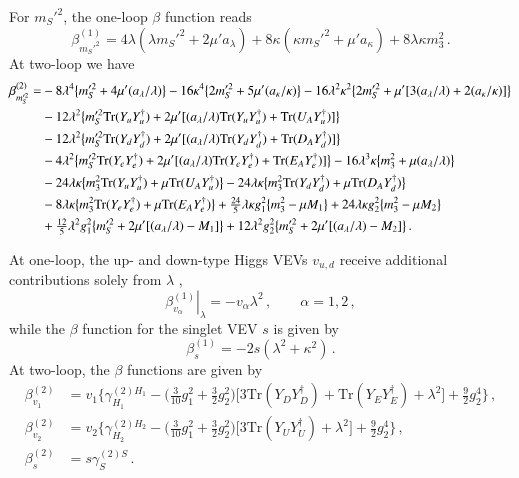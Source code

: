 \documentclass[final,3p,times]{elsarticle}
\newcommand{\be}{\begin{equation}}
\newcommand{\ee}{\end{equation}}
\newcommand{\lamsq}{\lambda^2}
\newcommand{\kapsq}{\kappa^2}
\newcommand{\tr}{\mathrm{Tr}}
\newcommand{\mtrisq}{m_3^2}
\newcommand{\msprsq}{m_S'^2}
\newcommand{\Alam}{a_\lambda/\lambda}
\begin{document}
For $\msprsq$, the one-loop $\beta$ function reads
%
\begin{equation}
\beta_{\msprsq}^{(1)} = 4\lambda(\lambda\msprsq + 2\mu' a_\lambda) + 8\kappa(\kappa\msprsq + \mu' a_\kappa) + 8\lambda\kappa\mtrisq \,.
\end{equation}
%
%
At two-loop we have
\begin{align}
\beta_{\msprsq}^{(2)} =& -8\lambda^4\big\{\msprsq + 4\mu'(a_\lambda/\lambda)\big\} - 16\kappa^4\big\{ 2\msprsq + 5\mu'(a_\kappa/\kappa) \big\} 
- 16\lamsq\kapsq\big\{ 2\msprsq + \mu'[3(a_\lambda/\lambda) + 2(a_\kappa/\kappa)] \big\} \notag \\
%
&-12\lamsq\big\{ \msprsq\tr( Y_u Y_u^\dagger) + 2\mu'[(\Alam)\tr( Y_u Y_u^\dagger) + \tr( U_A Y_u^\dagger)] \big\} \notag \\
%
&-12\lamsq\big\{\msprsq\tr( Y_d Y_d^\dagger) + 2\mu'[(\Alam)\tr( Y_d Y_d^\dagger) + \tr( D_A Y_d^\dagger)] \big\} \notag \\
%
&-4\lamsq\big\{\msprsq\tr( Y_e Y_e^\dagger) + 2\mu'[(\Alam)\tr( Y_e Y_e^\dagger) + \tr( E_A Y_e^\dagger)] \big\} 
-16\lambda^3\kappa\big\{ \mtrisq + \mu(\Alam)\big \} \notag \\
%
&-24\lambda\kappa\big\{ \mtrisq\tr( Y_u Y_u^\dagger) + \mu\tr( U_A Y_u^\dagger)\big\} 
-24\lambda\kappa\big\{ \mtrisq\tr( Y_d Y_d^\dagger) + \mu\tr( D_A Y_d^\dagger)\big\} \notag \\
%
&-8\lambda\kappa\big\{ \mtrisq\tr( Y_e Y_e^\dagger) + \mu\tr( E_A Y_e^\dagger)\big\} 
+\tfrac{24}{5}\lambda\kappa g_1^2\big\{\mtrisq - \mu M_1\big\} + 24\lambda\kappa g_2^2\big\{\mtrisq - \mu M_2 \big\} \notag \\
%
&+\tfrac{12}{5}\lamsq g_1^2\big\{\msprsq + 2\mu'[(\Alam) - M_1]\big\} 
+12\lamsq g_2^2 \big\{\msprsq + 2\mu'[(\Alam) - M_2] \big\}\,.
\end{align}

At one-loop, the up- and down-type Higgs VEVs $v_{u,d}$ receive additional contributions solely from $\lambda$ \cite{Sper13},
%
\be
\left.\beta^{(1)}_{v_\alpha}\right|_\lambda = -v_\alpha\lamsq\,, \qquad \alpha=1,2\,,
\ee
%
while the $\beta$ function for the singlet VEV $s$ is given by
%
\be 
\beta^{(1)}_s = -2s(\lamsq + \kapsq)\,.
\ee
%
At two-loop, the $\beta$ functions are given by \cite{Sper13,Sper13-2}
%
\begin{align}
\beta^{(2)}_{v_1} &= v_1\Bigg\{\gamma^{(2)H_1}_{H_1} - \Big(\tfrac{3}{10}g_1^2 + \tfrac{3}{2}g_2^2\Big)\Big[3\tr(Y_DY_D^\dagger) + \tr(Y_EY_E^\dagger) + \lamsq\Big] + \tfrac{9}{2}g_2^4\Bigg\}\,, \\
%
\beta^{(2)}_{v_2} &= v_2\Bigg\{\gamma^{(2)H_2}_{H_2} - 
\Big(\tfrac{3}{10}g_1^2 + \tfrac{3}{2}g_2^2\Big)
\Big[3\tr(Y_UY_U^\dagger) + \lamsq\Big] + \tfrac{9}{2}g_2^4\Bigg\}\,, \\
%
\beta^{(2)}_s &= s\gamma^{(2)S}_S\,.
\end{align}
\end{document}
